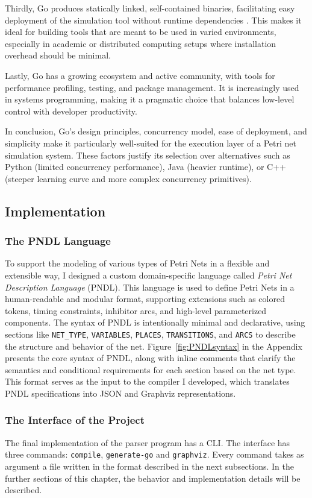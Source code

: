 \documentclass[12pt]{article}
\begin{document}
    Thirdly, Go produces statically linked, self-contained binaries, facilitating easy deployment of the simulation tool without runtime dependencies \cite{pike2012go}. This makes it ideal for building tools that are meant to be used in varied environments, especially in academic or distributed computing setups where installation overhead should be minimal.

    Lastly, Go has a growing ecosystem and active community, with tools for performance profiling, testing, and package management. It is increasingly used in systems programming, making it a pragmatic choice that balances low-level control with developer productivity.

    In conclusion, Go's design principles, concurrency model, ease of deployment, and simplicity make it particularly well-suited for the execution layer of a Petri net simulation system. These factors justify its selection over alternatives such as Python (limited concurrency performance), Java (heavier runtime), or C++ (steeper learning curve and more complex concurrency primitives).

    \subsection{Implementation}
        \subsubsection{The PNDL Language}
            To support the modeling of various types of Petri Nets in a flexible and extensible way, I designed a custom domain-specific language called \emph{Petri Net Description Language} (PNDL). This language is used to define Petri Nets in a human-readable and modular format, supporting extensions such as colored tokens, timing constraints, inhibitor arcs, and high-level parameterized components. The syntax of PNDL is intentionally minimal and declarative, using sections like \texttt{NET\_TYPE}, \texttt{VARIABLES}, \texttt{PLACES}, \texttt{TRANSITIONS}, and \texttt{ARCS} to describe the structure and behavior of the net. 
            Figure~\ref{fig:PNDLsyntax} in the Appendix presents the core syntax of PNDL, along with inline comments that clarify the semantics and conditional requirements for each section based on the net type. This format serves as the input to the compiler I developed, which translates PNDL specifications into JSON and Graphviz representations.      
        \subsubsection{The Interface of the Project}   
            The final implementation of the parser program has a CLI. The interface has three commands: \texttt{compile}, \texttt{generate-go} and \texttt{graphviz}. Every command takes as argument a file written in the format described in the next subsections. In the further sections of this chapter, the behavior and implementation details will be described.
\end{document}

